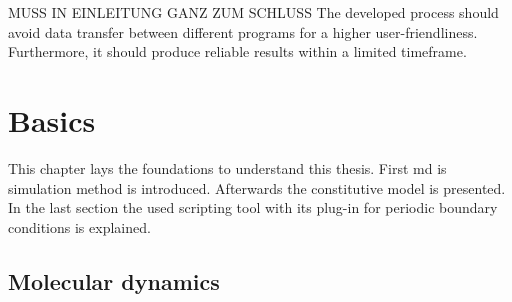 

MUSS IN EINLEITUNG GANZ ZUM SCHLUSS
The developed process should avoid data transfer between different programs for a higher user-friendliness. Furthermore, it should produce reliable results within a limited timeframe. 


\chapter{Basics} \label{chap: basics}
This chapter lays the foundations to understand this thesis. First \acrfull{md} is simulation method is introduced. Afterwards the constitutive model is presented. In the last section the used scripting tool with its plug-in for periodic boundary conditions is explained.  

\section{Molecular dynamics} \label{sec: MDBasics}
